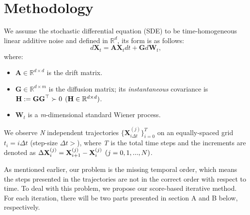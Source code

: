 \documentclass[conference]{IEEEtran}
\begin{document}
\section{Methodology}
We assume the stochastic differential equation (SDE) to be time-homogeneous linear additive
noise and defined in $\mathbb{R}^d$, its form is as follows:
\begin{equation}\label{SDE_general_form}
d\mathbf{X}_t = \mathbf{AX}_tdt + \mathbf{G}d\mathbf{W}_t,
\end{equation}
where:
\begin{itemize}
    \item $\mathbf{A} \in \mathbb{R}^{d \times d}$ is the drift matrix.
    \item $\mathbf{G} \in \mathbb{R}^{d \times m}$ is the diffusion matrix; its \textit{instantaneous}
        covariance is $\mathbf{H} := \mathbf{GG}^\top \succ 0 \hspace{0.15cm} (\mathbf{H} \in \mathbb{R}^{d \times d})$.
    \item $\mathbf{W}_t$ is a \textit{m}-dimensional standard Wiener process.
\end{itemize}

We observe \textit{N} independent trajectories $\bigl\{\mathbf{X}^{(j)}_{i\Delta t}\bigr\}_{i=0}^{T}$ on an equally-spaced
grid $t_i = i \Delta t$ (step-size $\Delta t > $), where \textit{T} is the total time steps and the increments are denoted as
$\Delta\mathbf{X}_i^{(j)} = \mathbf{X}_{i+1}^{(j)} - \mathbf{X}_i^{(j)} \hspace{0.15cm} (j = 0, 1, ..., N)$.

As mentioned earlier, our problem is the missing temporal order, which means the steps presented in the trajectories are not in
the correct order with respect to time. To deal with this problem, we propose our score-based iterative method.
For each iteration, there will be two parts presented in section A and B below, respectively.
\end{document}
